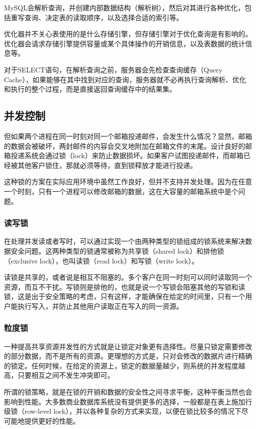 MySQL会解析查询，并创建内部数据结构（解析树），然后对其进行各种优化，包括重写查询、决定表的读取顺序，以及选择合适的索引等。

优化器并不关心表使用的是什么存储引擎，但存储引擎对于优化查询是有影响的。优化器会请求存储引擎提供容量或某个具体操作的开销信息，以及表数据的统计信息等。

对于SELECT语句，在解析查询之前，服务器会先检查查询缓存（Query Cache），如果能够在其中找到对应的查询，服务器就不必再执行查询解析、优化和执行的整个过程，而是直接返回查询缓存中的结果集。

\subsection{并发控制}

但如果两个进程在同一时刻对同一个邮箱投递邮件，会发生什么情况？显然，邮箱的数据会被破坏，两封邮件的内容会交叉地附加在邮箱文件的末尾。设计良好的邮箱投递系统会通过锁（lock）来防止数据损坏。如果客户试图投递邮件，而邮箱已经被其他客户锁住，那就必须等待，直到锁释放才能进行投递。

这种锁的方案在实际应用环境中虽然工作良好，但并不支持并发处理。因为在任意一个时刻，只有一个进程可以修改邮箱的数据，这在大容量的邮箱系统中是个问题。

\subsubsection*{读写锁}

在处理并发读或者写时，可以通过实现一个由两种类型的锁组成的锁系统来解决数据安全问题。这两种类型的锁通常被称为共享锁（shared lock）和排他锁（exclusive lock），也叫读锁（read lock）和写锁（write lock）。

读锁是共享的，或者说是相互不阻塞的。多个客户在同一时刻可以同时读取同一个资源，而互不干扰。写锁则是排他的，也就是说一个写锁会阻塞其他的写锁和读锁，这是出于安全策略的考虑，只有这样，才能确保在给定的时间里，只有一个用户能执行写入，并防止其他用户读取正在写入的同一资源。

\subsubsection*{粒度锁}

一种提高共享资源并发性的方式就是让锁定对象更有选择性。尽量只锁定需要修改的部分数据，而不是所有的资源。更理想的方式是，只对会修改的数据片进行精确的锁定。任何时候，在给定的资源上，锁定的数据量越少，则系统的并发程度越高，只要相互之间不发生冲突即可。

所谓的锁策略，就是在锁的开销和数据的安全性之间寻求平衡，这种平衡当然也会影响到性能。大多数商业数据库系统没有提供更多的选择，一般都是在表上施加行级锁（row-level lock），并以各种复杂的方式来实现，以便在锁比较多的情况下尽可能地提供更好的性能。

